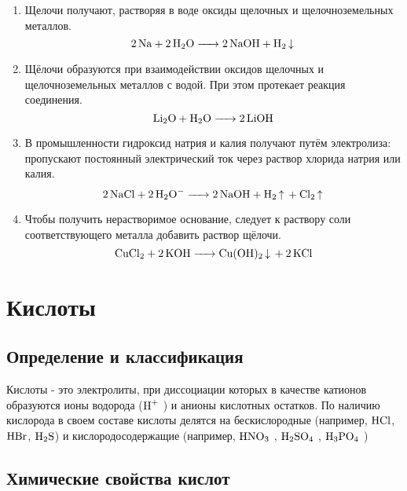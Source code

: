 \begin{enumerate}
    \item Щелочи получают, растворяя в воде оксиды щелочных и щелочноземельных
        металлов.
        $$\ce{2Na + 2H2O -> 2NaOH + H2 v }$$
    \item Щёлочи образуются при взаимодействии оксидов щелочных и щелочноземельных
        металлов с водой. При этом протекает реакция соединения.
        $$\ce{Li2O + H2O -> 2LiOH}$$
    \item В промышленности гидроксид натрия и калия получают путём электролиза:
        пропускают постоянный электрический ток через раствор хлорида натрия или
        калия.
        $$\ce{2NaCl + 2H2O- -> 2NaOH + H2 ^  + Cl2 ^} $$
    \item Чтобы получить нерастворимое основание, следует к раствору соли
        соответствующего металла добавить раствор щёлочи.
        $$\ce{CuCl2 + 2KOH -> Cu(OH)2 v + 2KCl}$$
\end{enumerate}

\section{Кислоты}
\subsection{Определение и классификация}
Кислоты - это электролиты, при диссоциации которых в качестве катионов
образуются ионы водорода ($\ce{H+}$ ) и анионы кислотных остатков.
По наличию кислорода в своем составе кислоты делятся на бескислородные
(например, $\ce{HCl}$, $\ce{HBr}$, $\ce{H2S}$) и кислородосодержащие (например, $\ce{HNO3}$ , $\ce{H2SO4}$ , $\ce{H3PO4}$ )

\subsection{Химические свойства кислот}

